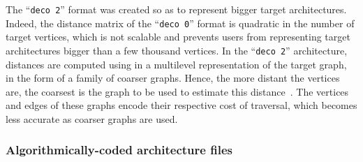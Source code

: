 The ``\texttt{deco 2}'' format was created so as to represent bigger
target architectures. Indeed, the distance matrix of the
``\texttt{deco 0}'' format is quadratic in the number of target
vertices, which is not scalable and prevents users from representing
target architectures bigger than a few thousand vertices. In the
``\texttt{deco 2}'' architecture, distances are computed using in a
multilevel representation of the target graph, in the form of a family
of coarser graphs. Hence, the more distant the vertices are, the
coarsest is the graph to be used to estimate this
distance~\cite{pellegrini:hal-01671156}. The vertices and edges of
these graphs encode their respective cost of traversal, which becomes
less accurate as coarser graphs are used.

\subsubsection{Algorithmically-coded architecture files}
\label{sec-file-target-algo}

